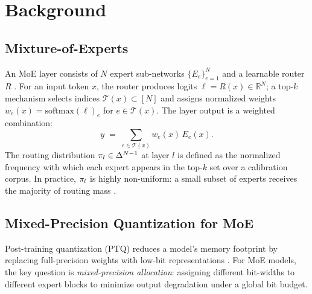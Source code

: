 \section{Background}
\label{sec:background}

\subsection{Mixture-of-Experts}

An MoE layer consists of $N$ expert sub-networks $\{E_e\}_{e=1}^{N}$ and a learnable router $R$ \citep{shazeer2017outrageously}. For an input token $x$, the router produces logits $\ell = R(x) \in \mathbb{R}^N$; a top-$k$ mechanism selects indices $\mathcal{T}(x) \subset [N]$ and assigns normalized weights $w_e(x) = \mathrm{softmax}(\ell)_e$ for $e \in \mathcal{T}(x)$. The layer output is a weighted combination:
\begin{equation}
\label{eq:moe}
  y \;=\; \sum_{e \in \mathcal{T}(x)} w_e(x)\, E_e(x).
\end{equation}
The routing distribution $\pi_l \in \Delta^{N-1}$ at layer $l$ is defined as the normalized frequency with which each expert appears in the top-$k$ set over a calibration corpus. In practice, $\pi_l$ is highly non-uniform: a small subset of experts receives the majority of routing mass \citep{fedus2022switch,zoph2022stmoe}.

\subsection{Mixed-Precision Quantization for MoE}

Post-training quantization (PTQ) reduces a model's memory footprint by replacing full-precision weights with low-bit representations \citep{frantar2023gptq,lin2024awq,xiao2023smoothquant,dettmers2022llmint8}. For MoE models, the key question is \emph{mixed-precision allocation}: assigning different bit-widths to different expert blocks to minimize output degradation under a global bit budget.

